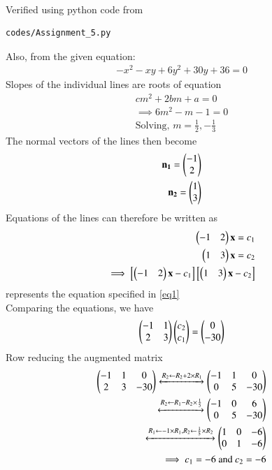 \documentclass[journal,12pt,twocolumn]{IEEEtran}
\begin{document}
\\
Verified using python code from
\begin{lstlisting}
codes/Assignment_5.py
\end{lstlisting}
Also, from the given equation:
\begin{align}
-x^2-xy+6y^2+30y+36=0 \label{eq1}
\end{align}
Slopes of the individual lines are roots of equation 
\begin{align}
    cm^2+2bm+a=0\\
    \implies 6m^2-m-1=0\\
    \text{Solving, }m=\frac{1}{2},-\frac{1}{3}
\end{align}
The normal vectors of the lines then become
\begin{align}
    \mathbf{n_1}=\begin{pmatrix}-1\\2\end{pmatrix}\\
    \mathbf{n_2}=\begin{pmatrix}1\\3\end{pmatrix}
\end{align}
Equations of the lines can therefore be written as
\begin{align}
  \begin{pmatrix}-1&2\end{pmatrix}\mathbf{x}=c_1\\
   \begin{pmatrix}1&3\end{pmatrix}\mathbf{x}=c_2\\
  \implies \left[\begin{pmatrix}-1&2\end{pmatrix}\mathbf{x}-c_1\right]\left[\begin{pmatrix}1&3\end{pmatrix}\mathbf{x}-c_2\right]
\end{align}
represents the equation specified in \eqref{eq1}\\
Comparing the equations, we have
\begin{align}
    \begin{pmatrix}-1&1\\2&3\end{pmatrix}\begin{pmatrix}c_2\\c_1\end{pmatrix}=\begin{pmatrix}0\\-30\end{pmatrix}\\
 \end{align}
 Row reducing the augmented matrix
 \begin{align}
    \begin{pmatrix}-1&1&0\\2&3&-30\end{pmatrix}\xleftrightarrow[]{R_2\leftarrow R_2+2\times R_1}
    \begin{pmatrix}-1&1&0\\0&5&-30\end{pmatrix}\\
    \xleftrightarrow[]{R_2\leftarrow R_1- R_2\times \frac{1}{5}}
    \begin{pmatrix}-1&0&6\\0&5&-30\end{pmatrix}\\
    \xleftrightarrow[]{R_1\leftarrow -1\times R_1  , R_2\leftarrow \frac{1}{5}\times R_2}
    \begin{pmatrix}1&0&-6\\0&1&-6\end{pmatrix}\\
    \implies c_1=-6 \text{ and }c_2=-6
\end{align}
\end{document}
